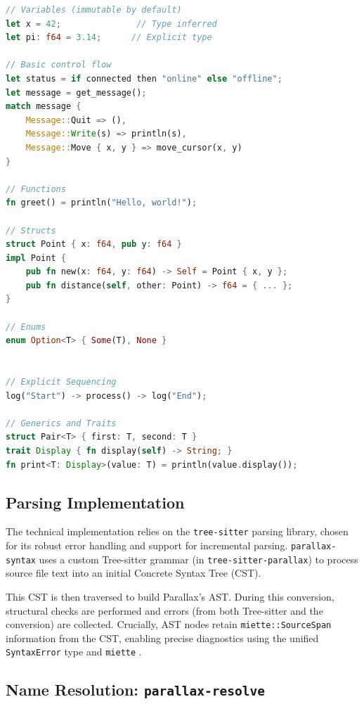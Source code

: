 \begin{lstlisting}[language=Rust, caption={Parallax Language Syntax Tour}, label={lst:impl_syntax_tour}]
// Variables (immutable by default)
let x = 42;               // Type inferred
let pi: f64 = 3.14;      // Explicit type

// Basic control flow
let status = if connected then "online" else "offline";
let message = get_message();
match message {
    Message::Quit => (),
    Message::Write(s) => println(s),
    Message::Move { x, y } => move_cursor(x, y)
}

// Functions
fn greet() = println("Hello, world!");

// Structs
struct Point { x: f64, pub y: f64 }
impl Point {
    pub fn new(x: f64, y: f64) -> Self = Point { x, y };
    pub fn distance(self, other: Point) -> f64 = { ... };
}

// Enums
enum Option<T> { Some(T), None }


// Explicit Sequencing
log("Start") -> process() -> log("End");

// Generics and Traits
struct Pair<T> { first: T, second: T }
trait Display { fn display(self) -> String; }
fn print<T: Display>(value: T) = println(value.display());
\end{lstlisting}

\subsection{Parsing Implementation}

The technical implementation relies on the \texttt{tree-sitter} parsing library, chosen for its robust error handling and support for incremental parsing. \texttt{parallax-syntax} uses a custom Tree-sitter grammar (in \texttt{tree-sitter-parallax}) to process source file text into an initial Concrete Syntax Tree (CST).

This CST is then traversed to build Parallax's AST. During this conversion, structural checks are performed and errors (from both Tree-sitter and the conversion) are collected. Crucially, AST nodes retain \texttt{miette::SourceSpan} information from the CST, enabling precise diagnostics using the unified \texttt{SyntaxError} type and \texttt{miette} \cite{Miette}.

\subsection{Name Resolution: \texttt{parallax-resolve}}

